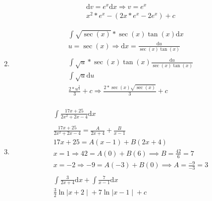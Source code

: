 \documentclass{article}
\begin{document}
\begin{enumerate}
\begin{gather*}
		      \mathrm{d}v = e^x \mathrm{d}x \Rightarrow v = e^x \\
		      x^2 * e^x - (2x * e^x - 2e^x) + c
	      \end{gather*}
	\item
	      \begin{gather*}
		      \int \sqrt{\sec(x)} * \sec(x)\tan(x) \mathrm{d}x \\
		      u = \sec(x) \Rightarrow \mathrm{d}x = \frac{\mathrm{d}u}{\sec(x)\tan(x)} \\ \\
		      \int \sqrt{u} * \sec(x)\tan(x) \frac{\mathrm{d}u}{\sec(x)\tan(x)} \\
		      \int \sqrt{u} \mathrm{d}u \\
		      \frac{2*u^{\frac{3}{2}}}{3} + c \Rightarrow \frac{2*\sec(x)\sqrt{\sec(x)}}{3} +c \\
	      \end{gather*}
	\item
	      \begin{gather*}
		      \int \frac{17x + 25}{2x^2 + 2x - 4} \mathrm{d}x \\ \\
		      \frac{17x + 25}{2x^2 + 2x - 4} = \frac{A}{2x + 4} + \frac{B}{x - 1} \\
		      17x + 25 = A(x - 1) + B(2x + 4) \\
		      x = 1 \Rightarrow 42 = A(0) + B(6) \implies B = \frac{42}{6} = 7 \\
		      x = -2 \Rightarrow -9 = A(-3) + B(0) \implies A = \frac{-9}{-3} = 3 \\ \\
		      \int \frac{3}{2x + 4} \mathrm{d}x + \int \frac{7}{x - 1} \mathrm{d}x \\
		      \frac{3}{2} \ln{\mid{x + 2}\mid} + 7 \ln{\mid{x - 1}\mid} + c
	      \end{gather*}
\end{enumerate}
\end{document}
